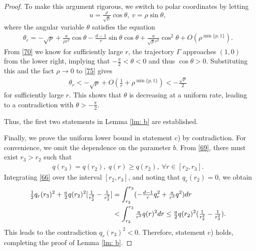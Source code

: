 \documentclass[12pt]{amsart}
\newcommand{\R}{\mathbb R}
\begin{document}
\begin{proof}
To make this argument rigorous, we switch to polar coordinates by letting 
\[u=\tfrac \rho{\sqrt p} \cos \theta, \ v=\rho \sin\theta,
\]
 where the angular variable $\theta$ satisfies the equation
\begin{align}\label{75}
\theta_r=-\sqrt p +\frac a{\rho r^2}\cos\theta-\tfrac{d-1}r \sin\theta\cos\theta +\tfrac a{\sqrt p r^2}\cos^2\theta
+O(\rho^{\min\{ p, 1\}}). 
\end{align}
From \eqref{70} we know for sufficiently large $r$, the trajectory $\Gamma$ approaches $(1,0)$ from the lower right, implying that $-\tfrac\pi 2<\theta<0$ and thus $\cos \theta>0$. Substituting this and the fact $\rho\to 0$ to \eqref{75} gives 
\begin{align}\label{76}
\theta_r<-\sqrt p+O(\tfrac 1r+\rho^{\min\{p, 1\}})<-\tfrac{\sqrt p}2
\end{align}
for sufficiently large $r$. This shows that $\theta$ is decreasing at a uniform rate, leading to a contradiction with $\theta> -\frac \pi2$. 

Thus, the first two statements in Lemma \ref{lm: b} are established. 


Finally, we prove the uniform lower bound in statement c) by contradiction. For convenience, we omit the dependence on the parameter $b$. 
 From \eqref{69}, there must exist $r_3>r_2$ such that 
\begin{align}\label{78}
q(r_3)=q(r_2), \; q(r)\ge q(r_2), \ \forall r\in [r_2, r_3]. 
\end{align}
 Integrating \eqref{66} over the interval $[r_2, r_3]$, and noting that $q_r(r_2)=0$, we obtain 
 \begin{align}
 \tfrac 12 q_r( r_3)^2+\tfrac a2 q(r_2)^2[\tfrac 1{r_2^2}-\tfrac 1{r_3^2}]&=\int_{r_2}^{r_3}(-\tfrac{d-1}r q_r^2+\tfrac a{r^3} q^2) dr\notag\\
 &<\int_{r_2}^{r_3}\tfrac a{r^3} q(r)^2 dr\le \tfrac a2 q(r_2)^2(\tfrac 1{r_2^2}-\tfrac 1{r_3^2}).\label{79}
 \end{align}
 This leads to the contradiction $q_r(r_3)^2<0$. Therefore, statement c) holds, completing the proof of Lemma \ref{lm: b}.
\end{proof}
\end{document}
